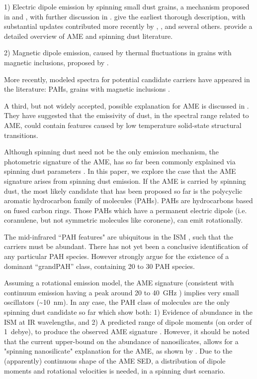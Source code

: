 \documentclass[preprint2,longabstract]{aastex}
\begin{document}
 1) Electric dipole emission by spinning small dust grains, a mechanism proposed in \cite{erickson57} and \cite{hoyle70}, with further discussion in \cite{ferrara94}. \cite{draine98b} give the earliest thorough description, with substantial updates contributed more recently by \cite{ysard10a}, \cite{ali-haimoud09}, \cite{hoang10} and several others. \cite{dickinson13r} provide a detailed overview of AME and spinning dust literature.

 2) Magnetic dipole emission, caused by thermal fluctuations in grains with magnetic inclusions, proposed by \cite{draine99}.

 More recently, modeled spectra for potential candidate carriers have appeared in the literature: PAHs, grains with magnetic inclusions \citep{draine13, ali-haimoud14, hoang16a}.

A third, but not widely accepted, possible explanation for AME is discussed in \cite{jones09}. They have suggested that the emissivity of dust, in the spectral range related to AME, could contain features caused by low temperature solid-state structural transitions.


     Although spinning dust need not be the only emission mechanism, the photometric signature of the AME, has so far been commonly explained via spinning dust parameters \citep{ysard11,ali-haimoud10}. In this paper, we explore the case that the AME signature arises from spinning dust emission. If the AME is carried by spinning dust, the most likely candidate that has been proposed so far is the polycyclic aromatic hydrocarbon family of molecules (PAHs). PAHs are hydrocarbons based on fused carbon rings. Those PAHs which have a permanent electric dipole (i.e. coranulene, but not symmetric molecules like coronene), can emit rotationally.

     The mid-infrared ``PAH features" are ubiquitous in the ISM \citep{giard94,onaka96,onaka00}, such that the carriers must be abundant. There has not yet been a conclusive identification of any particular PAH species. However \cite{andrews15} strongly argue for the  existence of a dominant ``grandPAH'' class, containing 20 to 30 PAH species.

     Assuming a rotational emission model, the AME signature (consistent with continuum emission having a peak around 20 to 40~GHz ) implies very small oscillators (\textasciitilde{}10~nm). In any case, the PAH class of molecules are the only spinning dust candidate so far which show both: 1) Evidence of abundance in the ISM at IR wavelengths, and 2) A predicted range of dipole moments (on order of 1~debye), to produce the observed AME signature \citep{draine98b, lovas05, thorwirth07}. However, it should be noted that the current upper-bound on the abundance of nanosilicates, allows for a "spinning nanosilicate" explanation for the AME, as shown by \cite{hensley17a}. Due to the (apparently) continuous shape of the AME SED, a distribution of dipole moments and rotational velocities is needed, in a spinning dust scenario.
\end{document}
